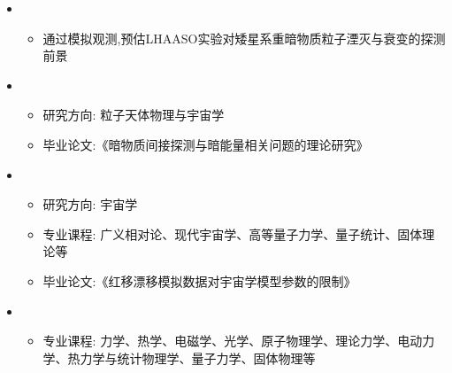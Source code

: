   \begin{itemize}[leftmargin=*]
     \item
      {\small
      \begin{itemize}
         \item 通过模拟观测,预估LHAASO实验对矮星系重暗物质粒子湮灭与衰变的探测前景     
      \end{itemize}
      }
    \item
      {\small
      \begin{itemize}
         \item 研究方向: 粒子天体物理与宇宙学
         \item 毕业论文:《暗物质间接探测与暗能量相关问题的理论研究》
      \end{itemize}
      }
      
     \item    
      {\small
      \begin{itemize}
         \item{研究方向:  宇宙学}
         \item 专业课程: 广义相对论、现代宇宙学、高等量子力学、量子统计、固体理论等       
         \item 毕业论文:《红移漂移模拟数据对宇宙学模型参数的限制》
      \end{itemize}
      }

    \item
      {\small
      \begin{itemize}
         \item 专业课程: 力学、热学、电磁学、光学、原子物理学、理论力学、电动力学、热力学与统计物理学、量子力学、固体物理等
      \end{itemize}
      }
  \end{itemize}